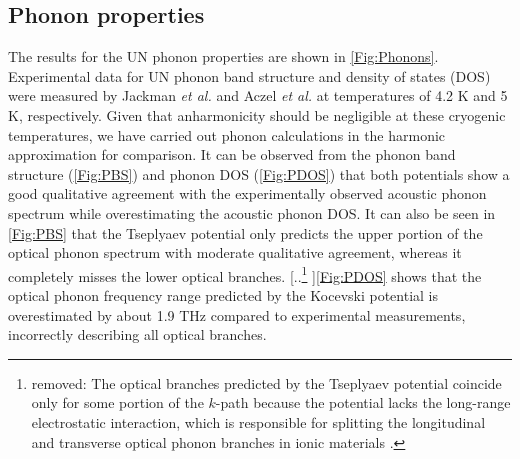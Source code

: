 \documentclass[preprint, 12pt]{elsarticle}
\providecommand{\DIFdeltex}[1]{{\protect\color{red} [..\footnote{removed: #1} ]}} %
\providecommand{\DIFaddbegin}{} %
\providecommand{\DIFdelbegin}{} %
\providecommand{\DIFdelend}{} %
\providecommand{\DIFdel}[1]{\texorpdfstring{\DIFdeltex{#1}}{}} %
\newcommand{\DIFscaledelfig}{0.5}
\newlength{\DIFdelgraphicswidth} %
\newlength{\DIFdelgraphicsheight} %
\newcommand{\DIFaddincludegraphics}[2][]{{\color{blue}\fbox{\DIFOincludegraphics[#1]{#2}}}} %
\newcommand{\DIFdelincludegraphics}[2][]{%
\sbox{\DIFdelgraphicsbox}{\DIFOincludegraphics[#1]{#2}}%
\settoboxwidth{\DIFdelgraphicswidth}{\DIFdelgraphicsbox} %
\settoboxtotalheight{\DIFdelgraphicsheight}{\DIFdelgraphicsbox} %
\scalebox{\DIFscaledelfig}{%
\parbox[b]{\DIFdelgraphicswidth}{\usebox{\DIFdelgraphicsbox}\\[-\baselineskip] \rule{\DIFdelgraphicswidth}{0em}}\llap{\resizebox{\DIFdelgraphicswidth}{\DIFdelgraphicsheight}{%
\setlength{\unitlength}{\DIFdelgraphicswidth}%
\begin{picture}(1,1)%
\thicklines\linethickness{2pt} %
{\color[rgb]{1,0,0}\put(0,0){\framebox(1,1){}}}%
{\color[rgb]{1,0,0}\put(0,0){\line( 1,1){1}}}%
{\color[rgb]{1,0,0}\put(0,1){\line(1,-1){1}}}%
\end{picture}%
}\hspace*{3pt}}} %
} %
\DeclareRobustCommand{\DIFaddbegin}{\DIFOaddbegin \let\includegraphics\DIFaddincludegraphics} %
\DeclareRobustCommand{\DIFdelbegin}{\DIFOdelbegin \let\includegraphics\DIFdelincludegraphics} %
\DeclareRobustCommand{\DIFdelend}{\DIFOaddend \let\includegraphics\DIFOincludegraphics} %
\begin{document}
\subsection{Phonon properties}
\label{sub:phonon}

The results for the UN phonon properties are shown in \cref{Fig:Phonons}. Experimental data for UN phonon band structure and density of states (DOS) were measured by Jackman \textit{et al.} \cite{Jackman1986} and Aczel \textit{et al.} \cite{Aczel2012} at temperatures of 4.2 K and 5 K, respectively. Given that anharmonicity should be negligible at these cryogenic temperatures, we have carried out phonon calculations in the harmonic approximation for comparison. It can be observed from the phonon band structure (\cref{Fig:PBS}) and phonon DOS (\cref{Fig:PDOS}) that both potentials show a good qualitative agreement with the experimentally observed acoustic phonon spectrum while overestimating the acoustic phonon DOS. It can also be seen in \cref{Fig:PBS} that the Tseplyaev potential only predicts the upper portion of the optical phonon spectrum with moderate qualitative agreement, whereas it completely misses the lower optical branches. \DIFdelbegin \DIFdel{The optical branches predicted by the Tseplyaev potential coincide only for some portion of the $k$-path because the potential lacks the long-range electrostatic interaction, which is responsible for splitting the longitudinal and transverse optical phonon branches in ionic materials \cite{Zhou2009}. }\DIFdelend \cref{Fig:PDOS} shows that the optical phonon frequency range predicted by the Kocevski potential is overestimated by about 1.9 THz compared to experimental measurements, incorrectly describing all optical branches.

\DIFaddbegin 
\end{document}

